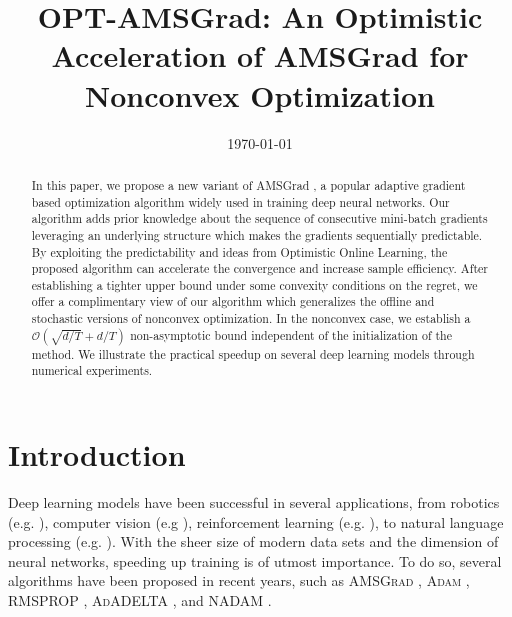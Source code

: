 \documentclass[11pt]{article}
\theoremstyle{k}
\begin{document}
\title{OPT-AMSGrad: An Optimistic Acceleration of AMSGrad for Nonconvex Optimization}
\date{\today}

\maketitle


\begin{abstract}
In this paper, we propose a new variant of AMSGrad \citep{RKK18}, a popular adaptive gradient based optimization algorithm widely used in training deep neural networks. 
Our algorithm adds prior knowledge about the sequence of consecutive mini-batch gradients leveraging an underlying structure which makes the gradients sequentially predictable. 
By exploiting the predictability and ideas from Optimistic Online Learning, the proposed algorithm can accelerate the convergence and increase sample efficiency.
After establishing a tighter upper bound under some convexity conditions on the regret, we offer a complimentary view of our algorithm which generalizes the offline and stochastic versions of nonconvex optimization. 
In the nonconvex case, we establish a $\mathcal{O}\left(\sqrt{d/T} +d/T \right)$ non-asymptotic bound independent of the initialization of the method.
We illustrate the practical speedup on several deep learning models through numerical experiments.
\end{abstract}

\section{Introduction}

Deep learning models have been successful in several applications, from robotics (e.g. \citep{LFDA17}), computer vision (e.g \citep{Rnet16,goodfellow2014generative}), reinforcement learning (e.g. \citep{Atari13}), to natural language processing (e.g. \citep{GMH13}).
With the sheer size of modern data sets and the dimension of neural networks, speeding up training is of utmost importance.
To do so, several algorithms have been proposed in recent years, such as  \textsc{AMSGrad} \citep{RKK18}, \textsc{Adam} \citep{KB15}, \textsc{RMSPROP} \citep{TH12}, \textsc{AdADELTA} \citep{Z12}, and \textsc{NADAM} \citep{D16}.
\end{document}
